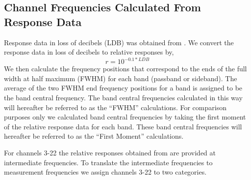 \subsection{Channel Frequencies Calculated From Response Data}

Response data in loss of decibels (LDB) was obtained from \cite{ATMS_PFM_CalLog}. We convert the response data in loss of decibels to relative responses by, 
\begin{equation}
  r=10^{{-0.1*LDB}}    
\end{equation}
We then calculate the frequency positions that correspond to the ends of the full width at half maximum (FWHM) for each band (passband or sideband). The average of the two FWHM end frequency 
positions for a band is assigned to be the band central frequency. The band central frequencies calculated in this way will hereafter be referred to as the ``FWHM'' calculations. For comparison purposes only we calculated band central frequencies by taking the first moment of the relative response data for each band. These band central frequencies
will hereafter be referred to as the ``First Moment'' calculations.



 
For channels 3-22 the relative responses obtained from \cite{ATMS_PFM_CalLog} are provided at intermediate frequencies. 
To translate the intermediate frequencies to measurement frequencies we assign channels 3-22 to two categories. 

